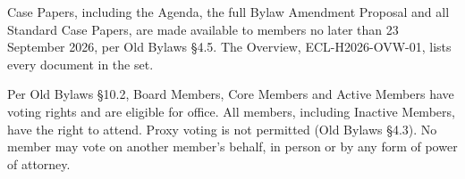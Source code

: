 \documentclass{../../../Common/Latex/Templates/rapport}
\begin{document}
Case Papers, including the Agenda, the full Bylaw Amendment Proposal and all Standard Case Papers, are made available to members no later than 23 September 2026, per Old Bylaws \S4.5. The Overview, ECL-H2026-OVW-01, lists every document in the set.

Per Old Bylaws \S10.2, Board Members, Core Members and Active Members have voting rights and are eligible for office. All members, including Inactive Members, have the right to attend. Proxy voting is not permitted (Old Bylaws \S4.3). No member may vote on another member's behalf, in person or by any form of power of attorney.
\end{document}
